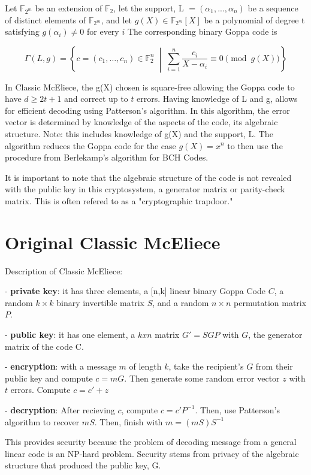 Let $\mathbb{F}_{2^m}$ be an extension of $\mathbb{F}_2$, 
let the support, L $=(\alpha_1,...,\alpha_n)$ be a sequence of distinct elements
of $\mathbb{F}_{2^m}$, and let $g(X)\in\mathbb{F}_{2^m}[X]$ 
be a polynomial of degree t satisfying $g(\alpha_i)\neq0$
for every $i$ The corresponding binary Goppa code is

\[\Gamma(L,g) = \left\{ c = (c_1,\dots,c_n) \in \mathbb{F}_2^n 
\; \middle| \; \sum_{i=1}^{n} \frac{c_i}{X-\alpha_i} \equiv 0 
\pmod{g(X)} \right\} \]

In Classic McEliece, the g(X) chosen is square-free allowing the
Goppa code to have $d\geq2t+1$ and correct up to $t$ errors. 
Having knowledge of L and g, allows for efficient decoding using
Patterson's algorithm. In this algorithm, the error vector is
determined by knowledge of the aspects of the code, its algebraic
structure. Note: this includes knowledge of g(X) and the support, L.
The algorithm reduces the Goppa code for the case $g(X) = x^n$ to then
use the procedure from Berlekamp's algorithm for BCH Codes. 

It is important to note that the algebraic
structure of the code is not revealed with the public key
in this cryptosystem, a generator matrix or parity-check matrix. 
This is often refered to as a "cryptographic trapdoor."



\section{Original Classic McEliece}

Description of Classic McEliece:

- \textbf{private key}: it has three elements, a [n,k] linear binary Goppa Code $C$,
a random $k \times k$ binary invertible matrix $S$, and a random
$n \times n$ permutation matrix $P$.

- \textbf{public key}: it has one element, a $k x n$ matrix $G' = SGP$ with $G$,
the generator matrix of the code C.

- \textbf{encryption}: with a message $m$ of length $k$, take the recipient's $G$ from
their public key and compute $c = mG$.
Then generate some random error vector $z$ with $t$ errors. Compute $c=c'+z$

- \textbf{decryption}: After recieving $c$, compute $c=c'P^{-1}$. Then, use Patterson's
algorithm to recover $mS$. Then, finish with $m=(mS)S^{-1}$

This provides security because the problem of decoding message from a 
general linear code is an NP-hard problem. Security stems from privacy of the
algebraic structure that produced the public key, G.


